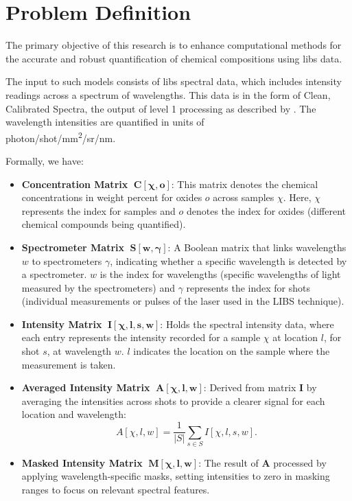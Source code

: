 \section{Problem Definition}\label{sec:problem_definition}
The primary objective of this research is to enhance computational methods for the accurate and robust quantification of chemical compositions using \gls{libs} data.

The input to such models consists of \gls{libs} spectral data, which includes intensity readings across a spectrum of wavelengths. This data is in the form of Clean, Calibrated Spectra\cite{andersonImprovedAccuracyQuantitative2017}, the output of level 1 processing as described by \citet{wiensPreflightCalibrationInitial2013}. The wavelength intensities are quantified in units of \\ photon/shot/mm\textsuperscript{2}/sr/nm.

Formally, we have:
\begin{itemize}[topsep=0pt]
    \item \textbf{Concentration Matrix} $\;\mathbf{C[\chi, o]}$: This matrix denotes the chemical concentrations in weight percent for oxides $o$ across samples $\chi$. Here, $\chi$ represents the index for samples and $o$ denotes the index for oxides (different chemical compounds being quantified).
    \item \textbf{Spectrometer Matrix} $\;\mathbf{S[w, \gamma]}$: A Boolean matrix that links wavelengths $w$ to spectrometers $\gamma$, indicating whether a specific wavelength is detected by a spectrometer. $w$ is the index for wavelengths (specific wavelengths of light measured by the spectrometers) and $\gamma$ represents the index for shots (individual measurements or pulses of the laser used in the LIBS technique).
    \item \textbf{Intensity Matrix} $\;\mathbf{I[\chi, l, s, w]}$: Holds the spectral intensity data, where each entry represents the intensity recorded for a sample $\chi$ at location $l$, for shot $s$, at wavelength $w$. $l$ indicates the location on the sample where the measurement is taken.
    \item \textbf{Averaged Intensity Matrix} $\;\mathbf{A[\chi, l, w]}$: Derived from matrix $\mathbf{I}$ by averaging the intensities across shots to provide a clearer signal for each location and wavelength:
    \[
    A[\chi, l, w] = \frac{1}{|S|} \sum_{s \in S} I[\chi, l, s, w].
    \]
    \item \textbf{Masked Intensity Matrix} $\;\mathbf{M[\chi, l, w]}$: The result of $\mathbf{A}$ processed by applying wavelength-specific masks, setting intensities to zero in masking ranges to focus on relevant spectral features.
\end{itemize}

